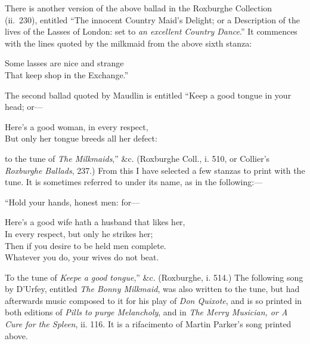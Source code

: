 There is another version of the above ballad in the Roxburghe Collection
(ii.~230), entitled “The innocent Country Maid’s Delight; or a Description of
the lives of the Lasses of London: set to \textit{an excellent Country Dance}.” It commences
with the lines quoted by the milkmaid from the above sixth stanza:
\settowidth{\versewidth}{That keep shop in the Exchange.”}
\begin{scverse}
Some lasses are nice and strange\\
That keep shop in the Exchange.”
\end{scverse}
\pagebreak

The second ballad quoted by Maudlin is entitled “Keep a good tongue in your
head; or—
\settowidth{\versewidth}{But only her tongue breeds all her defect:}
\begin{scverse}
Here’s a good woman, in every respect,\\
But only her tongue breeds all her defect:
\end{scverse}

to the tune of \textit{The Milkmaids},” \&c. (Roxburghe Coll., i. 510, or Collier’s \textit{Roxburghe
Ballads}, 237.) From this I have selected a few stanzas to print with the
tune. It is sometimes referred to under its name, as in the following:—

“Hold your hands, honest men: for—
\settowidth{\versewidth}{Here’s a good wife hath a husband that likes her,}
\begin{scverse}
Here’s a good wife hath a husband that likes her,\\
In every respect, but only he strikes her;\\
Then if you desire to be held men complete.\\
Whatever you do, your wives do not beat.
\end{scverse}

To the tune of \textit{Keepe a good tongue},” \&c. (Roxburghe, i. 514.) The following
song by D’Urfey, entitled \textit{The Bonny Milkmaid}, was also written to the tune, but
had afterwards music composed to it for his play of \textit{Don Quixote}, and is so printed
in both editions of \textit{ Pills to purge Melancholy}, and in \textit{The Merry Musician, or
A Cure for the Spleen}, ii. 116. It is a rifacimento of Martin Parker’s song
printed above.

